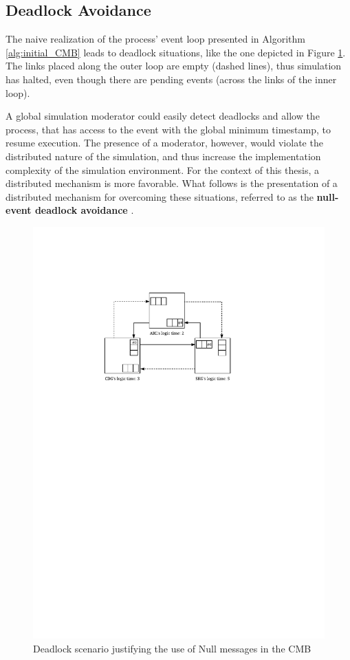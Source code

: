 \documentclass[11pt]{article}
\begin{document}
\subsection{Deadlock Avoidance}
\label{sec:org523f396}
The naive realization of the process' event loop presented in Algorithm \ref{alg:initial_CMB} leads to deadlock situations, like the one depicted in Figure \ref{fig:orgccf1c23}.
The links placed along the outer loop are empty (dashed lines), thus simulation has halted, even though there are pending events (across the links of the inner loop).

A global simulation moderator could easily detect deadlocks and allow the process, that has access to the event with the global minimum timestamp, to resume execution.
The presence of a moderator, however, would violate the distributed nature of the simulation, and thus increase the implementation complexity of the simulation environment.
For the context of this thesis, a distributed mechanism is more favorable.
What follows is the presentation of a distributed mechanism for overcoming these situations, referred to as the \textbf{null-event deadlock avoidance} \cite{Fujimoto1999}.

\begin{figure}[htbp]
\centering
\includegraphics[width=0.64\linewidth]{Figures/deadlockScenario.pdf}
\caption{\label{fig:orgccf1c23}
Deadlock scenario justifying the use of Null messages in the CMB}
\end{figure}
\end{document}

